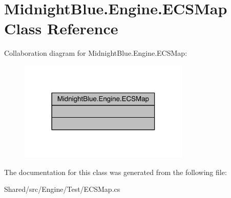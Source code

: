 \hypertarget{class_midnight_blue_1_1_engine_1_1_e_c_s_map}{}\section{Midnight\+Blue.\+Engine.\+E\+C\+S\+Map Class Reference}
\label{class_midnight_blue_1_1_engine_1_1_e_c_s_map}


Collaboration diagram for Midnight\+Blue.\+Engine.\+E\+C\+S\+Map\+:
\nopagebreak
\begin{figure}[H]
\begin{center}
\leavevmode
\includegraphics[width=231pt]{class_midnight_blue_1_1_engine_1_1_e_c_s_map__coll__graph}
\end{center}
\end{figure}


The documentation for this class was generated from the following file\+:\begin{DoxyCompactItemize}
\item 
Shared/src/\+Engine/\+Test/E\+C\+S\+Map.\+cs\end{DoxyCompactItemize}
